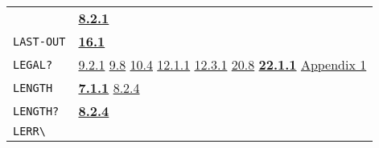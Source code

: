 \documentclass[a4paper,]{article}
\begin{document}
\begin{longtable}[]{@{}ll@{}}
\begin{minipage}[t]{0.24\columnwidth}
\end{minipage} & \begin{minipage}[t]{0.70\columnwidth}\raggedright\strut
\textbf{\href{08-truth.md\#821-arithmetic-1}{8.2.1}}\strut
\end{minipage}\tabularnewline
\begin{minipage}[t]{0.24\columnwidth}\raggedright\strut
\texttt{LAST-OUT}\strut
\end{minipage} & \begin{minipage}[t]{0.70\columnwidth}\raggedright\strut
\textbf{\href{16-errors-frames-etc.md\#161-listen}{16.1}}\strut
\end{minipage}\tabularnewline
\begin{minipage}[t]{0.24\columnwidth}\raggedright\strut
\texttt{LEGAL?}\strut
\end{minipage} & \begin{minipage}[t]{0.70\columnwidth}\raggedright\strut
\href{09-functions.md\#921-tuple-and-tuple-the-type-1}{9.2.1}
\href{09-functions.md\#98-activation-name-act-again-and-return-1}{9.8} \href{10-looping.md\#104-go-and-tag}{10.4}
\href{12-locatives.md\#1211-lloc}{12.1.1} \href{12-locatives.md\#1231-in}{12.3.1}
\href{20-coroutines.md\#208-sneakiness-with-processes}{20.8}
\textbf{\href{22-storage-management.md\#2211-stacks-and-other-internal-vectors}{22.1.1}}
\href{appendix-1-a-look-inside.md\#appendix-1-a-look-inside}{Appendix 1}\strut
\end{minipage}\tabularnewline
\begin{minipage}[t]{0.24\columnwidth}\raggedright\strut
\texttt{LENGTH}\strut
\end{minipage} & \begin{minipage}[t]{0.70\columnwidth}\raggedright\strut
\textbf{\href{07-structured-objects.md\#711-length-1}{7.1.1}} \href{08-truth.md\#824-object-properties-1}{8.2.4}\strut
\end{minipage}\tabularnewline
\begin{minipage}[t]{0.24\columnwidth}\raggedright\strut
\texttt{LENGTH?}\strut
\end{minipage} & \begin{minipage}[t]{0.70\columnwidth}\raggedright\strut
\textbf{\href{08-truth.md\#824-object-properties-1}{8.2.4}}\strut
\end{minipage}\tabularnewline
\begin{minipage}[t]{0.24\columnwidth}\raggedright\strut
\texttt{LERR\textbackslash{}}\strut
\end{minipage} & \begin{minipage}[t]{0.70\columnwidth}\raggedright\strut

\end{minipage}
\end{longtable}
\end{document}
